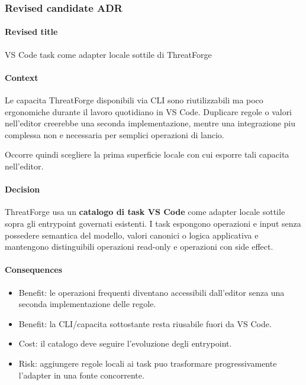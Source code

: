 \documentclass[
  10pt,
]{article}
\providecommand{\tightlist}{%
  \setlength{\itemsep}{0pt}\setlength{\parskip}{0pt}}
\begin{document}
\subsubsection{Revised candidate ADR}\label{revised-candidate-adr-13}

\paragraph{Revised title}\label{revised-title-13}

VS Code task come adapter locale sottile di ThreatForge

\paragraph{Context}\label{context-27}

Le capacita ThreatForge disponibili via CLI sono riutilizzabili ma poco
ergonomiche durante il lavoro quotidiano in VS Code. Duplicare regole o
valori nell'editor creerebbe una seconda implementazione, mentre una
integrazione piu complessa non e necessaria per semplici operazioni di
lancio.

Occorre quindi scegliere la prima superficie locale con cui esporre tali
capacita nell'editor.

\paragraph{Decision}\label{decision-27}

ThreatForge usa un \textbf{catalogo di task VS Code} come adapter locale
sottile sopra gli entrypoint governati esistenti. I task espongono
operazioni e input senza possedere semantica del modello, valori
canonici o logica applicativa e mantengono distinguibili operazioni
read-only e operazioni con side effect.

\paragraph{Consequences}\label{consequences-27}

\begin{itemize}
\tightlist
\item
  Benefit: le operazioni frequenti diventano accessibili dall'editor
  senza una seconda implementazione delle regole.
\item
  Benefit: la CLI/capacita sottostante resta riusabile fuori da VS Code.
\item
  Cost: il catalogo deve seguire l'evoluzione degli entrypoint.
\item
  Risk: aggiungere regole locali ai task puo trasformare
  progressivamente l'adapter in una fonte concorrente.
\end{itemize}
\end{document}
